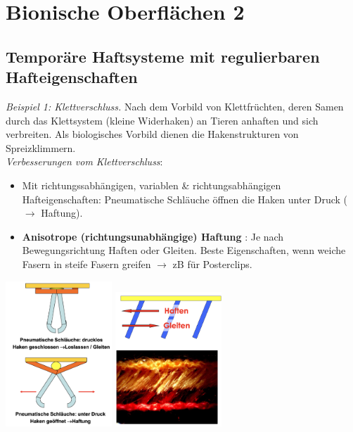 \section{Bionische Oberflächen 2}

\subsection{Temporäre Haftsysteme mit regulierbaren Hafteigenschaften}

\textit{Beispiel 1: Klettverschluss.} Nach dem Vorbild von Klettfrüchten, deren Samen durch das Klettsystem (kleine Widerhaken) an Tieren anhaften und sich verbreiten. Als biologisches Vorbild dienen die Hakenstrukturen von Spreizklimmern.
\\
\textit{Verbesserungen vom Klettverschluss}:
\begin{itemize}
    \item Mit richtungssabhängigen, variablen \& richtungsabhängigen Hafteigenschaften: Pneumatische Schläuche öffnen die Haken unter Druck ($\rightarrow$ Haftung).
    \item \textbf{Anisotrope (richtungsunabhängige) Haftung} \dangersign: Je nach Bewegungsrichtung Haften oder Gleiten. Beste Eigenschaften, wenn weiche Fasern in steife Fasern greifen $\rightarrow$ zB für Posterclips.
\end{itemize}

\begin{center}
    \includegraphics[width=4cm]{lec4/figures/pneumatik.png}
    \hfill
    \includegraphics[width=4cm]{lec4/figures/anisotropes_haften.png}
\end{center}

